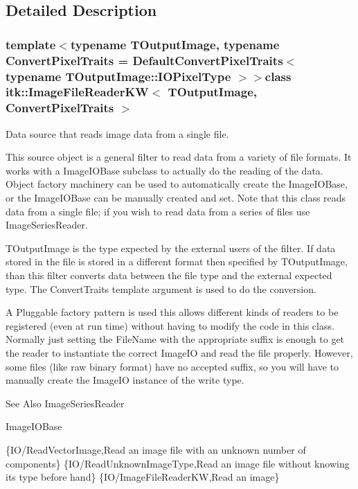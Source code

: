 \subsection{Detailed Description}
\subsubsection*{template$<$typename T\-Output\-Image, typename Convert\-Pixel\-Traits = Default\-Convert\-Pixel\-Traits$<$                    typename T\-Output\-Image\-::\-I\-O\-Pixel\-Type $>$$>$class itk\-::\-Image\-File\-Reader\-K\-W$<$ T\-Output\-Image, Convert\-Pixel\-Traits $>$}

Data source that reads image data from a single file. 

This source object is a general filter to read data from a variety of file formats. It works with a Image\-I\-O\-Base subclass to actually do the reading of the data. Object factory machinery can be used to automatically create the Image\-I\-O\-Base, or the Image\-I\-O\-Base can be manually created and set. Note that this class reads data from a single file; if you wish to read data from a series of files use Image\-Series\-Reader.

T\-Output\-Image is the type expected by the external users of the filter. If data stored in the file is stored in a different format then specified by T\-Output\-Image, than this filter converts data between the file type and the external expected type. The Convert\-Traits template argument is used to do the conversion.

A Pluggable factory pattern is used this allows different kinds of readers to be registered (even at run time) without having to modify the code in this class. Normally just setting the File\-Name with the appropriate suffix is enough to get the reader to instantiate the correct Image\-I\-O and read the file properly. However, some files (like raw binary format) have no accepted suffix, so you will have to manually create the Image\-I\-O instance of the write type.

\begin{DoxySeeAlso}{See Also}
Image\-Series\-Reader 

Image\-I\-O\-Base
\end{DoxySeeAlso}
\{I\-O/\-Read\-Vector\-Image,Read an image file with an unknown number of components\} \{I\-O/\-Read\-Unknown\-Image\-Type,Read an image file without knowing its type before hand\} \{I\-O/\-Image\-File\-Reader\-K\-W,Read an image\}  

